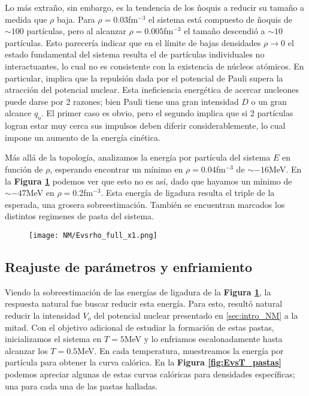 Lo más extraño, sin embargo, es la tendencia de los ñoquis a reducir su tamaño a medida que $\rho$ baja. 
Para $\rho=0.03$fm$^{-3}$ el sistema está compuesto de ñoquis de $\sim 100$ partículas, pero al alcanzar $\rho=0.005$fm$^{-3}$ el tamaño descendió a $\sim 10$ partículas.
Esto parecería indicar que en el límite de bajas densidades $\rho\to0$ el estado fundamental del sistema resulta el de partículas individuales no interactuantes, lo cual no es consistente con 
la existencia de núcleos atómicos. 
En particular, implica que la repulsión dada por el potencial de Pauli supera la atracción del potencial nuclear.
Esta ineficiencia energética de acercar nucleones puede darse por 2 razones; bien Pauli tiene una gran intensidad $D$ o un gran alcance $q_o$. 
El primer caso es obvio, pero el segundo implica que si 2 partículas logran estar muy cerca sus impulsos deben diferir considerablemente, lo cual impone un aumento de la energía cinética.

Más allá de la topología, analizamos la energía por partícula del sistema $E$ en función de $\rho$, esperando encontrar un mínimo en $\rho=0.04$fm$^{-3}$ de $\sim -16$MeV.
En la \textbf{Figura \ref{fig:Evsrho_QCNMx1}} podemos ver que esto no es así, dado que hayamos un mínimo de $\sim -47$MeV en $\rho=0.2$fm$^{-3}$.
Esta energía de ligadura resulta el triple de la esperada, una grosera sobreestimación. 
También se encuentran marcados los distintos regimenes de pasta del sistema. 

\begin{figure}[H]
	\centering
	\texttt{[image: NM/Evsrho\_full\_x1.png]}
	\caption{}
	\label{fig:Evsrho_QCNMx1}
\end{figure}

\subsection{Reajuste de parámetros y enfriamiento}

Viendo la sobreestimación de las energías de ligadura de la \textbf{Figura \ref{fig:Evsrho_QCNMx1}}, la respuesta natural fue buscar reducir esta energía.
Para esto, resultó natural reducir la intensidad $V_o$ del potencial nuclear presentado en \ref{sec:intro_NM} a la mitad.
Con el objetivo adicional de estudiar la formación de estas pastas, inicializamos el sistema en $T=5$MeV y lo enfriamos escalonadamente hasta alcanzar los $T=0.5$MeV.
En cada temperatura, muestreamos la energía por partícula para obtener la curva calórica.
En la \textbf{Figura \ref{fig:EvsT_pastas}} podemos apreciar algunas de estas curvas calóricas para densidades específicas; una para cada una de las pastas halladas.

